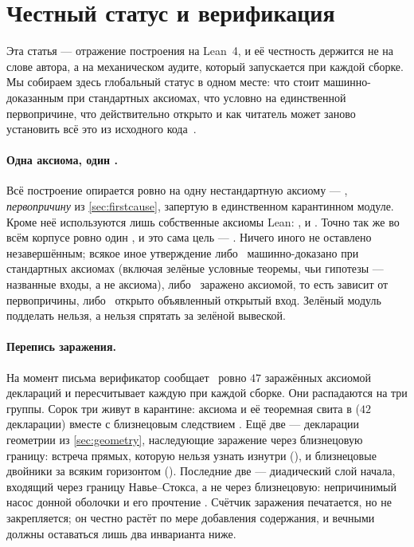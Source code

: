 \section{Честный статус и верификация}\label{sec:status}

Эта статья --- отражение построения на Lean~4, и её честность держится не на слове автора, а на
механическом аудите, который запускается при каждой сборке. Мы собираем здесь глобальный статус в
одном месте: что стоит машинно-доказанным при стандартных аксиомах, что условно на единственной
первопричине, что действительно открыто и как читатель может заново установить всё это из
исходного кода~\cite{lean4,mathlib,euclidspath-repo}.

\paragraph{Одна аксиома, один .}
Всё построение опирается ровно на одну нестандартную аксиому --- \axiom{}, \emph{первопричину} из
\cref{sec:firstcause}, запертую в единственном карантинном модуле. Кроме неё используются лишь
собственные аксиомы Lean: ,  и . Точно так же
во всём корпусе ровно один , и это сама цель --- . Ничего
иного не оставлено незавершённым; всякое иное утверждение либо \green{}~машинно-доказано при
стандартных аксиомах (включая зелёные условные теоремы, чьи гипотезы --- названные входы, а не
аксиома), либо \yellow{}~заражено аксиомой, то есть зависит от первопричины, либо \red{}~открыто
объявленный открытый вход. Зелёный модуль подделать нельзя, а  нельзя спрятать за
зелёной вывеской.

\paragraph{Перепись заражения.}
На момент письма верификатор сообщает \yellow{}~ровно $47$ заражённых аксиомой деклараций и
пересчитывает каждую при каждой сборке. Они распадаются на три группы. Сорок три живут в карантине:
аксиома \axiom{} и её теоремная свита в  ($42$ декларации)
вместе с близнецовым следствием . Ещё две --- декларации
геометрии из \cref{sec:geometry}, наследующие заражение через близнецовую границу: встреча прямых,
которую нельзя узнать изнутри (), и близнецовые
двойники за всяким горизонтом (). Последние две ---
диадический слой начала, входящий через границу Навье--Стокса, а не через близнецовую: непричинимый
насос донной оболочки и его прочтение . Счётчик
заражения печатается, но не закрепляется; он честно растёт по мере добавления содержания, и вечными
должны оставаться лишь два инварианта ниже.

